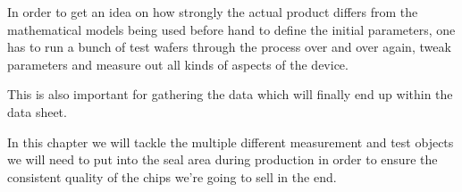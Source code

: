 In order to get an idea on how strongly the actual product differs from the mathematical models being used before hand to define the initial parameters, one has to run a bunch of test wafers through the process over and over again, tweak parameters and measure out all kinds of aspects of the device.

This is also important for gathering the data which will finally end up within the data sheet.

In this chapter we will tackle the multiple different measurement and test objects we will need to put into the seal area during production in order to ensure the consistent quality of the chips we're going to sell in the end.
